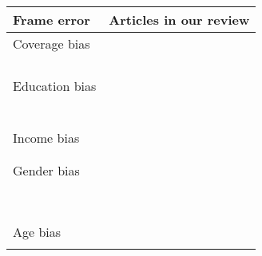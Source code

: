 \begin{table}
    \centering
	\begin{tabular}{ll}
		\toprule
		Frame error & Articles in our review\\
		\midrule
        Coverage bias & \cite{keusch_coverage_2020, revilla_online_2016}\\
        & \cite{gummer_does_2019, bucher_exploring_2021}\\
        & \cite{de_bruijne_mobile_2014}\\
        & \cite{fuchs_coverage_2009}\\
        & \cite{wells_what_2015}\\
        Education bias & \cite{de_bruijne_comparing_2013, keusch_coverage_2020}\\
        & \cite{gummer_does_2019}\\
        & \cite{de_bruijne_mobile_2014}\\
        & \cite{zou_mobile_2021}\\
        & \cite{skeie_smartphone_2019}\\
        & \cite{keusch_using_2021, keusch_web_2017}\\
        & \cite{toepoel_what_2014, wenz_willingness_2019}\\
        Income bias & \cite{haan_can_2019, zou_mobile_2021}\\
        & \cite{ skeie_smartphone_2019, toepoel_what_2014}\\
        & \cite{wenz_willingness_2019}\\
        Gender bias & \cite{haan_can_2019, de_bruijne_comparing_2013}\\
        & \cite{wells_comparison_2014, keusch_coverage_2020}\\
        & \cite{liebe_does_2015, lambert_living_2015}\\
        & \cite{bosch_measurement_2019}\\
    	& \cite{schlosser_mobile_2018}\\
        & \cite{de_bruijne_mobile_2014, zou_mobile_2021}\\
        & \cite{brosnan_pc_2017, skeie_smartphone_2019}\\
        & \cite{keusch_web_2017, toepoel_what_2014}\\
        & \cite{wenz_willingness_2019}\\
        Age bias & \cite{haan_can_2019, de_bruijne_comparing_2013}\\
        & \cite{wells_comparison_2014, keusch_coverage_2020}\\

\end{tabular}
\end{table}
